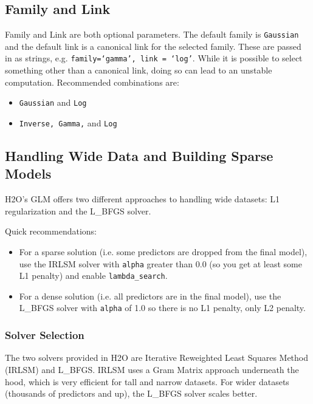 \subsection{Family and Link}

Family and Link are both optional parameters. The default family is \texttt{Gaussian} and the default link is a
canonical link for the selected family. These are passed in as strings, e.g. \texttt{family=`gamma', link = `log'}.
While it is possible to select something other than a canonical link, doing so can lead to an unstable
computation. Recommended combinations are:

\begin{itemize}
\item \texttt{Gaussian} and \texttt{Log}
\item \texttt{Inverse, Gamma,} and \texttt{Log}
\end{itemize} 

\subsection{Handling Wide Data and Building Sparse Models}

H2O's GLM offers two different approaches to handling wide datasets:  L1 regularization and the L\_BFGS solver.

Quick recommendations:

\begin{itemize}
\item For a sparse solution (i.e. some predictors are dropped from the final model), use the IRLSM solver with 
      \texttt{alpha} greater than 0.0 (so you get at least some L1 penalty) and enable \texttt{lambda\_search}.

\item For a dense solution (i.e. all predictors are in the final model), use the L\_BFGS solver with
      \texttt{alpha} of 1.0 so there is no L1 penalty, only L2 penalty.
\end{itemize}

\subsubsection{Solver Selection}

The two solvers provided in H2O are Iterative Reweighted Least Squares Method (IRLSM) and L\_BFGS.  IRLSM uses
a Gram Matrix approach underneath the hood, which is very efficient for tall and narrow datasets.  For wider 
datasets (thousands of predictors and up), the L\_BFGS solver scales better.

